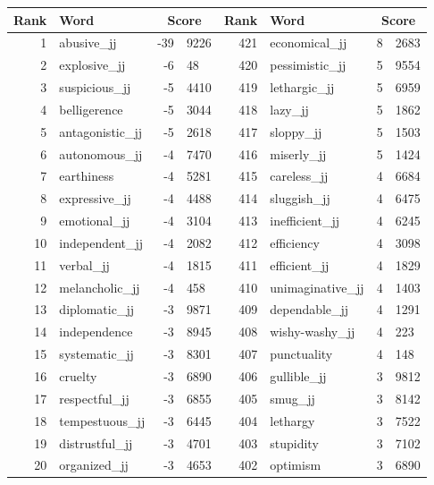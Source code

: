 \begin{table}[tbp]
    \begin{tabular}{| rlr@{.}l | rlr@{.}l |}
    \hline
    \textbf{Rank} & \textbf{Word} & \multicolumn{2}{c|}{\textbf{Score}} & \textbf{Rank} & \textbf{Word} & \multicolumn{2}{c|}{\textbf{Score}} \\
    \hline
    1 & abusive\_jj & -39 & 9226    &    421 & economical\_jj & 8 & 2683 \\
    2 & explosive\_jj & -6 & 48    &    420 & pessimistic\_jj & 5 & 9554 \\
    3 & suspicious\_jj & -5 & 4410    &    419 & lethargic\_jj & 5 & 6959 \\
    4 & belligerence & -5 & 3044    &    418 & lazy\_jj & 5 & 1862 \\
    5 & antagonistic\_jj & -5 & 2618    &    417 & sloppy\_jj & 5 & 1503 \\
    6 & autonomous\_jj & -4 & 7470    &    416 & miserly\_jj & 5 & 1424 \\
    7 & earthiness & -4 & 5281    &    415 & careless\_jj & 4 & 6684 \\
    8 & expressive\_jj & -4 & 4488    &    414 & sluggish\_jj & 4 & 6475 \\
    9 & emotional\_jj & -4 & 3104    &    413 & inefficient\_jj & 4 & 6245 \\
    10 & independent\_jj & -4 & 2082    &    412 & efficiency & 4 & 3098 \\
    11 & verbal\_jj & -4 & 1815    &    411 & efficient\_jj & 4 & 1829 \\
    12 & melancholic\_jj & -4 & 458    &    410 & unimaginative\_jj & 4 & 1403 \\
    13 & diplomatic\_jj & -3 & 9871    &    409 & dependable\_jj & 4 & 1291 \\
    14 & independence & -3 & 8945    &    408 & wishy-washy\_jj & 4 & 223 \\
    15 & systematic\_jj & -3 & 8301    &    407 & punctuality & 4 & 148 \\
    16 & cruelty & -3 & 6890    &    406 & gullible\_jj & 3 & 9812 \\
    17 & respectful\_jj & -3 & 6855    &    405 & smug\_jj & 3 & 8142 \\
    18 & tempestuous\_jj & -3 & 6445    &    404 & lethargy & 3 & 7522 \\
    19 & distrustful\_jj & -3 & 4701    &    403 & stupidity & 3 & 7102 \\
    20 & organized\_jj & -3 & 4653    &    402 & optimism & 3 & 6890 \\

\end{tabular}
\end{table}
